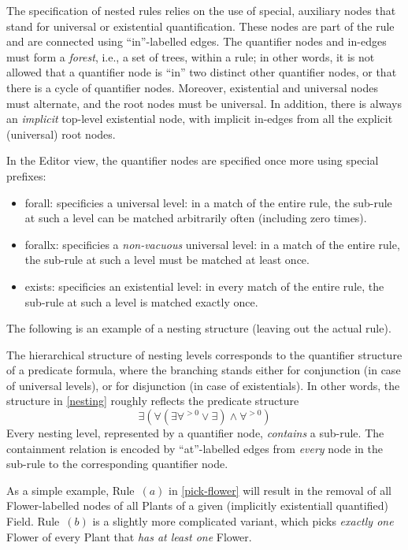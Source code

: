 The specification of nested rules relies on the use of special, auxiliary nodes
that stand for universal or existential quantification. These nodes are part of
the rule and are connected using ``\textsf{in}''-labelled edges. The quantifier
nodes and \textsf{in}-edges must form a \emph{forest}, i.e., a set of trees,
within a rule; in other words, it is not allowed that a quantifier node is
``\textsf{in}'' two distinct other quantifier nodes, or that there is a cycle
of quantifier nodes. Moreover, existential and universal nodes must alternate,
and the root nodes must be universal. In addition, there is always an
\emph{implicit} top-level existential node, with implicit \textsf{in}-edges
from all the explicit (universal) root nodes.

In the Editor view, the quantifier nodes are specified once more using special
prefixes:
\begin{itemize}\noitemsep
\item \textsf{forall:} specificies a universal level: in a match of the entire
  rule, the sub-rule at such a level can be matched arbitrarily often
  (including zero times).
\item \textsf{forallx:} specificies a \emph{non-vacuous} universal level: in a
  match of the entire rule, the sub-rule at such a level must be matched at
  least once.
\item \textsf{exists:} specificies an existential level: in every match of the
  entire rule, the sub-rule at such a level is matched exactly once.
\end{itemize}

The following is an example of a nesting structure (leaving out the actual
rule). 

%
The hierarchical structure of nesting levels corresponds to the quantifier
structure of a predicate formula, where the branching stands either for
conjunction (in case of universal levels), or for disjunction (in case of
existentials). In other words, the structure in \eqref{nesting} roughly
reflects the predicate structure
%
\[ \exists (\forall(\exists\forall^{>0} \vee \exists) \wedge \forall^{>0}) \]
%
Every nesting level, represented by a quantifier node, \emph{contains} a
sub-rule. The containment relation is encoded by ``\textsf{at}''-labelled edges
from \emph{every} node in the sub-rule to the corresponding quantifier node.

As a simple example, Rule~$(a)$ in \eqref{pick-flower} will result in the
removal of all \textsf{Flower}-labelled nodes of all \textsf{Plant}s of a given
(implicitly existentiall quantified) \textsf{Field}.  Rule~$(b)$ is a slightly
more complicated variant, which picks \emph{exactly one} \textsf{Flower} of
every \textsf{Plant} that \emph{has at least one} \textsf{Flower}.

